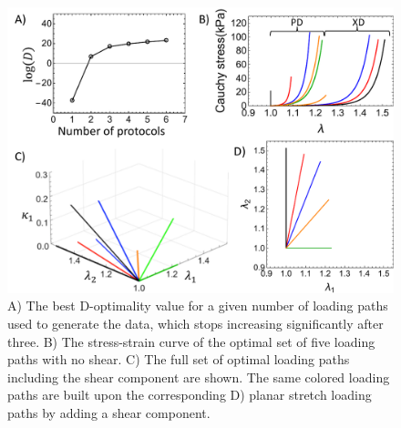     
\begin{figure}[hbtp]
\centering
\includegraphics[width=5.5in]{Figures/doptimality}
\caption{A) The best D-optimality value for a given number of loading paths used to generate the data, which stops increasing significantly after three. B) The stress-strain curve of the optimal set of five loading paths with no shear. C) The full set of optimal loading paths including the shear component are shown. The same colored loading paths are built upon the corresponding D) planar stretch loading paths by adding a shear component. }
\label{fig:doptimality}
\end{figure} 

